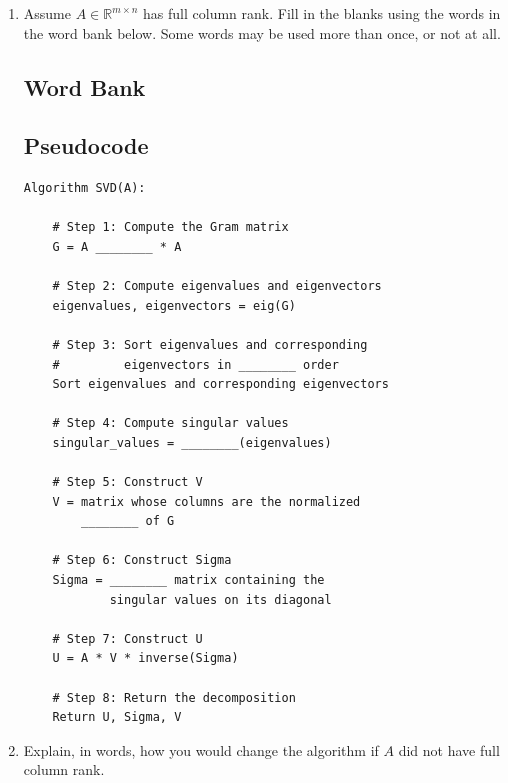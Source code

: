 \documentclass{ximera}
\begin{document}
\begin{exercise}

\begin{enumerate}
    \item Assume $A \in \mathbb{R}^{m\times n}$ has full column rank.  Fill in the blanks using the words in the word bank below.
Some words may be used more than once, or not at all.

\subsection*{Word Bank}

\begin{center}
\end{center}

\subsection*{Pseudocode}

\begin{lstlisting}
Algorithm SVD(A):

    # Step 1: Compute the Gram matrix
    G = A ________ * A

    # Step 2: Compute eigenvalues and eigenvectors
    eigenvalues, eigenvectors = eig(G)

    # Step 3: Sort eigenvalues and corresponding
    #         eigenvectors in ________ order
    Sort eigenvalues and corresponding eigenvectors

    # Step 4: Compute singular values
    singular_values = ________(eigenvalues)

    # Step 5: Construct V
    V = matrix whose columns are the normalized
        ________ of G

    # Step 6: Construct Sigma
    Sigma = ________ matrix containing the
            singular values on its diagonal

    # Step 7: Construct U
    U = A * V * inverse(Sigma)

    # Step 8: Return the decomposition
    Return U, Sigma, V
\end{lstlisting}

\item Explain, in words, how you would change the algorithm if $A$ did not have full column rank.
\end{enumerate}
\end{exercise}
\end{document}
